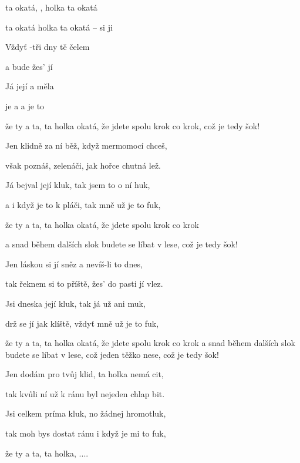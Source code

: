 

\zr
{} ta okatá,  ,
holka ta okatá  

 ta okatá  
holka ta okatá --  si ji 
\kr

\zs
Vždyť -tři dny  tě  čelem 

a  bude  žes'  jí 

Já  její  a  měla 

je  a  a  je to 

že ty a ta, ta holka okatá, že jdete spolu krok co krok,
což je tedy šok!
\ks

\zr \kr

\zs
Jen klidně za ní běž, když mermomocí chceš,

však poznáš, zelenáči, jak hořce chutná lež.

Já bejval její kluk, tak jsem to o ní huk,

a i když je to k pláči, tak mně už je to fuk,

že ty a ta, ta holka okatá, že jdete spolu krok co krok

a snad během dalších slok budete se líbat v lese,
což je tedy šok!
\ks

\zr \kr

\zs
Jen láskou si jí sněz a nevíš-li to dnes,

tak řeknem si to příště, žes' do pasti jí vlez.

Jsi dneska její kluk, tak já už ani muk,

drž se jí jak klíště, vždyť mně už je to fuk,

že ty a ta, ta holka okatá, že jdete spolu krok co krok
a snad během dalších slok
budete se líbat v lese, což jeden těžko nese, což je tedy šok!
\ks

\zr \kr

\zs
Jen dodám pro tvůj klid, ta holka nemá cit,

tak kvůli ní už k ránu byl nejeden chlap bit.

Jsi celkem príma kluk, no žádnej hromotluk,

tak moh bys dostat ránu i když je mi to fuk,

že ty a ta, ta holka, ....
\ks

\kp







